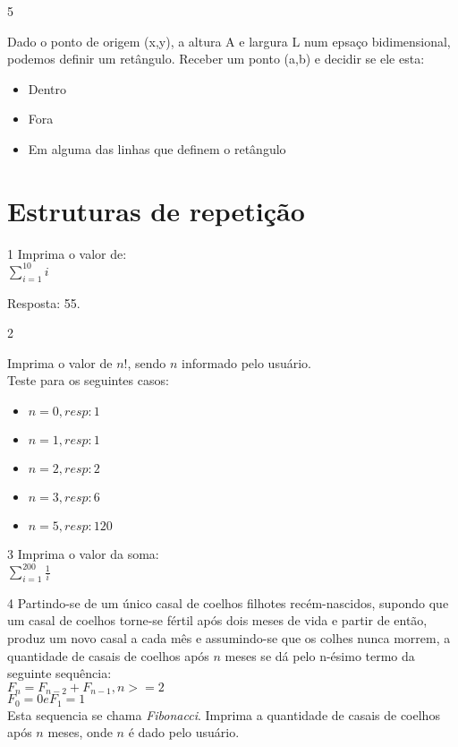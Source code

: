 \begin{exercicio}
  {5}
  {Dado o ponto de origem (x,y), a altura A e largura L num epsaço bidimensional, podemos definir um retângulo. Receber um ponto (a,b) e decidir se ele esta:
  \begin{itemize}
    \item Dentro
    \item Fora 
    \item Em alguma das linhas que definem o retângulo
  \end{itemize}}
\end{exercicio}

\section{Estruturas de repetição}
\begin{exercicio}
  {1}
  {Imprima o valor de: \\
  $\sum\limits_{i=1}^{10} i$}
  
  Resposta: 55.
\end{exercicio}

\begin{exercicio}
  {2}
  {Imprima o valor de $n!$, sendo $n$ informado pelo usuário. \\
  Teste para os seguintes casos: \\
  \begin{itemize}
    \item $n = 0, resp: 1$
    \item $n = 1, resp: 1$
    \item $n = 2, resp: 2$
    \item $n = 3, resp: 6$
    \item $n = 5, resp: 120$
  \end{itemize}}
\end{exercicio}

\begin{exercicio}
  {3}
  {Imprima o valor da soma: \\
  $\sum\limits_{i=1}^{200} \frac{1}{i}$}
\end{exercicio}

\begin{exercicio}
  {4}
  {Partindo-se de um único casal de coelhos filhotes recém-nascidos, supondo que um casal de coelhos torne-se fértil após dois meses de vida e partir de então, produz um novo casal a cada mês e assumindo-se que os colhes nunca morrem, a quantidade de casais de coelhos após $n$ meses se dá pelo n-ésimo termo da seguinte sequência: \\
  $F_{n} = F_{n-2} + F_{n-1}, n>=2$ \\
  $F_{0} = 0  e F_{1} = 1$ \\
  Esta sequencia se chama \textit{Fibonacci}. Imprima a quantidade de casais de coelhos após $n$ meses, onde $n$ é dado pelo usuário.}
\end{exercicio}

